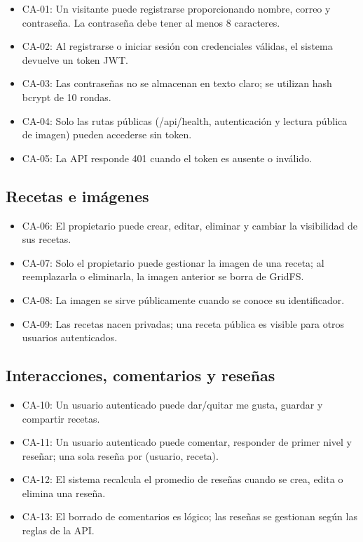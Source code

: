 \documentclass[doc,12pt,a4paper]{apa7}
\begin{document}
\begin{itemize}
    \item CA-01: Un visitante puede registrarse proporcionando nombre, correo y contraseña. La contraseña debe tener al menos 8 caracteres.
    \item CA-02: Al registrarse o iniciar sesión con credenciales válidas, el sistema devuelve un token JWT.
    \item CA-03: Las contraseñas no se almacenan en texto claro; se utilizan hash bcrypt de 10 rondas.
    \item CA-04: Solo las rutas públicas (/api/health, autenticación y lectura pública de imagen) pueden accederse sin token.
    \item CA-05: La API responde 401 cuando el token es ausente o inválido.
\end{itemize}

\subsection{Recetas e imágenes}

\begin{itemize}
    \item CA-06: El propietario puede crear, editar, eliminar y cambiar la visibilidad de sus recetas.
    \item CA-07: Solo el propietario puede gestionar la imagen de una receta; al reemplazarla o eliminarla, la imagen anterior se borra de GridFS.
    \item CA-08: La imagen se sirve públicamente cuando se conoce su identificador.
    \item CA-09: Las recetas nacen privadas; una receta pública es visible para otros usuarios autenticados.
\end{itemize}

\subsection{Interacciones, comentarios y reseñas}

\begin{itemize}
    \item CA-10: Un usuario autenticado puede dar/quitar me gusta, guardar y compartir recetas.
    \item CA-11: Un usuario autenticado puede comentar, responder de primer nivel y reseñar; una sola reseña por (usuario, receta).
    \item CA-12: El sistema recalcula el promedio de reseñas cuando se crea, edita o elimina una reseña.
    \item CA-13: El borrado de comentarios es lógico; las reseñas se gestionan según las reglas de la API.
\end{itemize}
\end{document}

